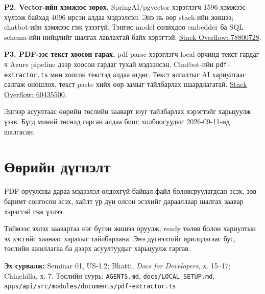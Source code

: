 \documentclass[11pt,a4paper]{article}
\newcommand{\pathref}[1]{\nolinkurl{#1}}
\newcommand{\src}[2]{\href{#1}{#2}}
\begin{document}
\textbf{P2. Vector-ийн хэмжээс зөрөх.} SpringAI/pgvector хэрэглэгч 1596 хэмжээс хүлээж байхад 4096 ирсэн алдаа мэдээлсэн. Энэ нь өөр stack-ийн жишээ; chatbot-ийн хэмжээс гэж үзээгүй. Тэнгис model солихдоо embedder ба SQL schema-ийн нийцлийг шалгах лавлахтай байх хэрэгтэй. \src{https://stackoverflow.com/questions/78800728/springai-4096-dimensions-for-java-files-trying-to-load-in-pg-vector-db}{Stack Overflow: 78800728}.

\textbf{P3. PDF-ээс текст хоосон гарах.} pdf-parse хэрэглэгч local орчинд текст гардаг ч Azure pipeline дээр хоосон гардаг тухай мэдээлсэн. Chatbot-ийн \pathref{pdf-extractor.ts} мөн хоосон текстэд алдаа өгдөг. Текст ялгалтыг AI хариултаас салгаж оношлох, текст paste хийх өөр замыг тайлбарлах шаардлагатай. \src{https://stackoverflow.com/questions/60435500/cannot-parse-a-pdf-stream-using-pdf-parse-on-azure-pipelines-nodejs}{Stack Overflow: 60435500}.

Эдгээр асуултаас өөрийн төслийн зааварт юуг тайлбарлах хэрэгтэйг харьцуулж үзэв. Бүгд миний төсөлд гарсан алдаа биш; холбоосуудыг 2026-09-11-нд шалгасан.
\section{Өөрийн дүгнэлт}
PDF оруулсны дараа мэдээлэл олдохгүй байвал файл боловсруулагдсан эсэх, зөв баримт сонгосон эсэх, хайлт үр дүн олсон эсэхийг дарааллаар шалгах заавар хэрэгтэй гэж үзлээ.

Тиймээс эхлэх заавартаа нэг бүтэн жишээ оруулж, ready төлөв болон хариултын эх хэсгийг хаанаас харахыг тайлбарлана. Энэ дүгнэлтийг ярилцлагаас бус, төслийн ажиллагаа ба дээрх асуултуудыг харьцуулж гаргав.

\textbf{Эх сурвалж:} Seminar 01, US-1.2; Bhatti, \textit{Docs for Developers}, х. 15--17; Chinchilla, х. 7. Төслийн суурь: \pathref{AGENTS.md}, \pathref{docs/LOCAL_SETUP.md}, \pathref{apps/api/src/modules/documents/pdf-extractor.ts}.
\end{document}
